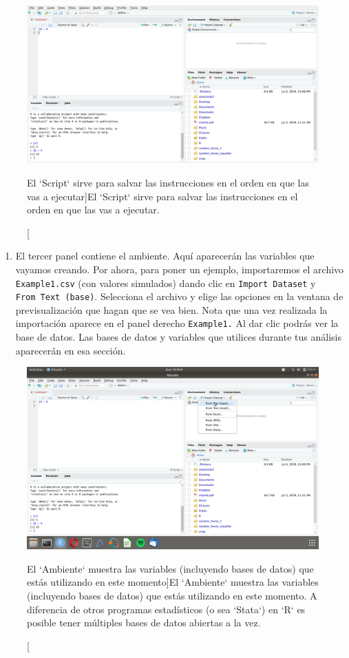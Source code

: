 \documentclass[]{tufte-book}
\providecommand{\tightlist}{%
  \setlength{\itemsep}{0pt}\setlength{\parskip}{0pt}}
\begin{document}
\begin{figure}
\includegraphics[width=40in]{images/RStudio5} \caption[El `Script` sirve para salvar las instrucciones en el orden en que las vas a ejecutar]{El `Script` sirve para salvar las instrucciones en el orden en que las vas a ejecutar.}\label{fig:unnamed-chunk-13}
\end{figure}

\begin{enumerate}
\def\labelenumi{\arabic{enumi}.}
\setcounter{enumi}{2}
\tightlist
\item
  El tercer panel contiene el ambiente. Aquí aparecerán las variables
  que vayamos creando. Por ahora, para poner un ejemplo, importaremos el
  archivo \texttt{Example1.csv} (con valores simulados) dando clic en
  \texttt{Import\ Dataset} y \texttt{From\ Text\ (base)}. Selecciona el
  archivo y elige las opciones en la ventana de previsualización que
  hagan que se vea bien. Nota que una vez realizada la importación
  aparece en el panel derecho \texttt{Example1.} Al dar clic podrás ver
  la base de datos. Las bases de datos y variables que utilices durante
  tus análisis aparecerán en esa sección.
\end{enumerate}

\begin{figure}
\includegraphics[width=40in]{images/RStudio6} \caption[El `Ambiente` muestra las variables (incluyendo bases de datos) que estás utilizando en este momento]{El `Ambiente` muestra las variables (incluyendo bases de datos) que estás utilizando en este momento. A diferencia de otros programas estadísticos (o sea `Stata`) en `R` es posible tener múltiples bases de datos abiertas a la vez.}\label{fig:unnamed-chunk-15}
\end{figure}
\end{document}
